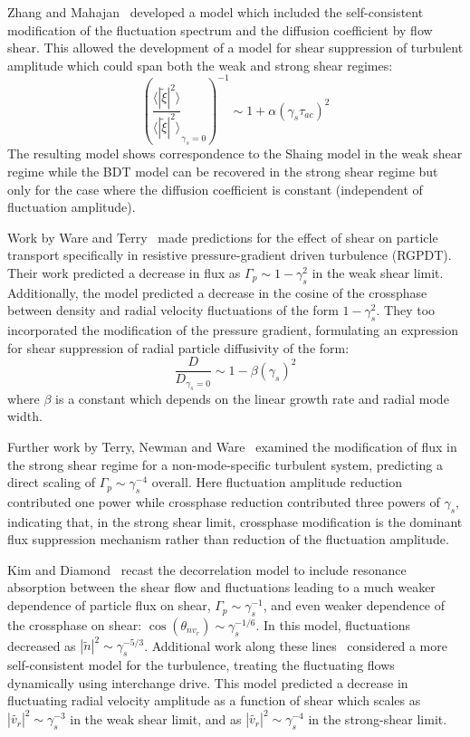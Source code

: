 \documentclass[aip,pop,amsmath,amssymb,preprint,superscriptaddress]{revtex4-1} %
\begin{document}
Zhang and Mahajan~\cite{zhang92,zhang93} developed a model which
included the self-consistent modification of the fluctuation spectrum
and the diffusion coefficient by flow shear.  This allowed the
development of a model for shear suppression of turbulent amplitude which could span both the weak and strong shear regimes:
%
\begin{equation}
\left(\frac{\langle |\tilde{\xi}|^{2} \rangle}{\langle |\tilde{\xi}|^{2} \rangle}_{\gamma_{s}=0}\right)^{-1} \sim 1+\alpha(\gamma_{s}\tau_{ac})^2
\label{eq:zm_theory}
\end{equation}
%
The resulting model shows correspondence to the Shaing model in the weak shear regime while the BDT model can be recovered in the strong shear regime but only for the case where the diffusion coefficient is constant (independent of fluctuation amplitude).

Work by Ware and Terry~\cite{ware96,ware98} made predictions for the
effect of shear on particle transport specifically in resistive
pressure-gradient driven turbulence (RGPDT). Their work predicted a decrease in flux as $\Gamma_{p} \sim 1-\gamma_{s}^2$ in the weak shear limit.  Additionally,  the model predicted a decrease in the cosine of the crossphase between density and radial velocity fluctuations of the form $1-\gamma_{s}^2$. They too incorporated the modification of the pressure gradient, formulating an expression for shear suppression of radial particle diffusivity of the form:
%
\begin{equation}
\frac{D}{D_{\gamma_{s}=0}} \sim 1-\beta(\gamma_{s})^2
\label{eq:ware_diff_theory}
\end{equation}
%
where $\beta$ is a constant which depends on the linear growth rate and radial mode width.

Further work by Terry, Newman and Ware~\cite{terry01} examined the modification of flux in the strong shear regime for a non-mode-specific turbulent system, predicting a direct scaling of $\Gamma_{p} \sim \gamma_{s}^{-4}$ overall.  Here fluctuation amplitude reduction contributed one power while crossphase reduction contributed three powers of $\gamma_s$, indicating that, in the strong shear limit, crossphase modification is the dominant flux suppression mechanism rather than reduction of the fluctuation amplitude. 

Kim and Diamond~\cite{kim03} recast the decorrelation model to include resonance absorption between the shear flow and fluctuations leading to a much weaker dependence of particle flux on shear, $\Gamma_{p} \sim \gamma_{s}^{-1}$, and even weaker dependence of the crossphase on shear: $\cos(\theta_{nv_{r}}) \sim \gamma_{s}^{-1/6}$.  In this model, fluctuations decreased as $|\tilde{n}|^{2} \sim \gamma_{s}^{-5/3}$. Additional work along these lines~\cite{kim04} considered a more self-consistent model for the turbulence, treating the fluctuating flows dynamically using interchange drive.  This model predicted a decrease in fluctuating radial velocity amplitude as a function of shear which scales as $|\tilde{v_{r}}|^{2} \sim \gamma_{s}^{-3}$ in the weak shear limit, and as $|\tilde{v_{r}}|^{2} \sim \gamma_{s}^{-4}$ in the strong-shear limit.
\end{document}
